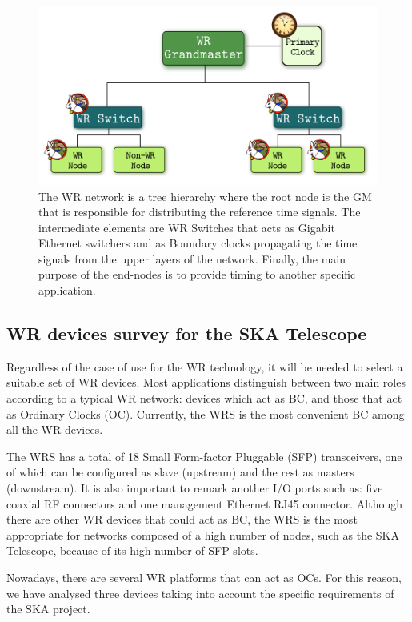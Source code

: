 \begin{figure}[H] \centering \includegraphics[scale=0.4]{img/wr_hierarchy}
	\caption{The WR network is a tree hierarchy where the root node is the
	GM that is responsible for distributing the reference time signals. The
	intermediate elements are WR Switches that acts as Gigabit Ethernet
	switchers and as Boundary clocks propagating the time signals from the
	upper layers of the network. Finally, the main purpose of the end-nodes
	is to provide timing to another specific application.}
\label{fig:wr_hierarchy} \end{figure}

\subsection{WR devices survey for the SKA Telescope} \label{subsec:wr-dev}

Regardless of the case of use for the WR technology, it will be needed to select
a suitable set of WR devices. Most applications distinguish between two main roles
according to a typical WR network: devices which act as BC, and those that act as
Ordinary Clocks (OC). Currently, the WRS \cite{ohwr:wrs} is the most convenient
BC among all the WR devices. 

The WRS has a total of 18 Small Form-factor Pluggable (SFP) transceivers, one of which can be configured as slave
(upstream) and the rest as masters (downstream). It is also important to remark
another I/O ports such as: five coaxial RF connectors and one management
Ethernet RJ45 connector. Although there are other WR devices that could act as
BC, the WRS is the most appropriate for networks composed of a high number of nodes,
such as the SKA Telescope, because of its high number of SFP slots.

Nowadays, there  are several WR platforms that can act as OCs. 
For this reason, we have analysed three devices taking into account the specific requirements of the SKA project.

